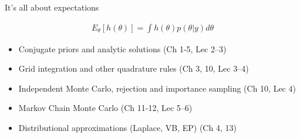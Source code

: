 \documentclass[english,t]{beamer}
\begin{document}
 \begin{frame}{It's all about expectations}

   \begin{align*}
   E_{\theta}[h(\theta)] = \int h(\theta) p(\theta|y) d\theta
   \end{align*}

  \begin{itemize}
  \item Conjugate priors and analytic solutions (Ch 1-5, Lec 2--3)
  \item Grid integration and other quadrature rules (Ch 3, 10, Lec 3--4)
  \item Independent Monte Carlo, rejection and importance sampling (Ch 10, Lec 4)
  \item Markov Chain Monte Carlo (Ch 11-12, Lec 5--6)
  \item {\color{gray}Distributional approximations (Laplace, VB, EP) (Ch 4, 13)}
  \end{itemize}
   

 \end{frame}
\end{document}
